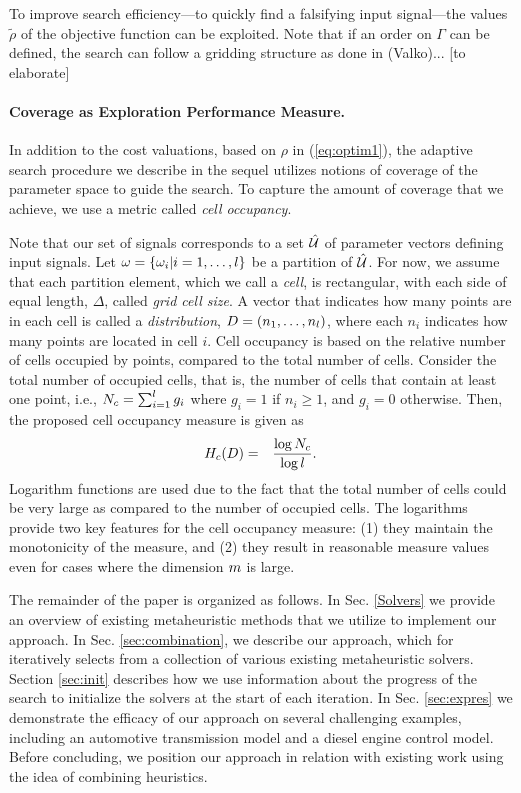 To improve search efficiency---to quickly find a falsifying input signal---the values $\tilde{\rho}$ of the objective function can be exploited. Note that if an order on $\Gamma$ can be defined, the search can follow a gridding structure as done in \cite{Valko2018} (Valko)... {\color{red} [to elaborate]}


\paragraph{Coverage as Exploration Performance Measure.}	

In addition to the cost valuations, based on $\rho$ in (\ref{eq:optim1}),
the adaptive search procedure we describe in the sequel utilizes notions of coverage of the parameter space to guide the search.
To capture the amount of coverage that we achieve, we use a metric called {\em cell occupancy}. 

Note that our set of signals corresponds to a set $\hat{\mathcal{U}}$ of parameter vectors defining input signals.
Let $\omega=\{ \omega_i | i=1,\ldots,
l \}$ be a partition of $\hat{\mathcal{U}}$. For now, we assume that each partition element,
which we call a \emph{cell}, is rectangular, with each side of equal
length, $\Delta$, called \emph{grid cell size}. A
vector that indicates how many points are in each cell is called a
\emph{distribution}, $D=(n_1,\ldots,n_l)$,
where each $n_i$ indicates how many points are located in cell $i$.
Cell occupancy is based on the relative number of cells occupied by
points, compared to the total number of cells. Consider the total
number of occupied cells, that is, the number of cells that contain
at least one point, i.e., $N_c =  \sum_{i=1}^{l} g_i$  
where $g_i = 1$ if  $n_i\geq 1$, and $g_i = 0$ otherwise. Then, the proposed cell occupancy measure is given as
\begin{eqnarray*}
H_c(D) & = & \frac{\log N_c}{\log l}.
\end{eqnarray*}
Logarithm functions are used due to the fact that the total number of cells could be very large as compared to the number of occupied cells. The logarithms provide two key features for the cell occupancy measure: (1) they maintain the monotonicity of the measure, and (2) they result in reasonable measure values even for cases where the dimension $m$ is  large. 


The remainder of the paper is organized as follows. 
In Sec. \ref{Solvers} we provide an overview of existing metaheuristic methods that we utilize to implement our approach. 
In Sec. \ref{sec:combination}, we describe our approach, which for iteratively selects from a collection of various existing metaheuristic solvers.
Section \ref{sec:init} describes how we use information about the progress of the search to initialize the solvers at the start of each iteration. 
In Sec. \ref{sec:expres} we demonstrate the efficacy of our approach on several challenging examples, including an automotive transmission model and a diesel engine control model. Before concluding, we position our approach in relation with existing work using the idea of combining heuristics. 

